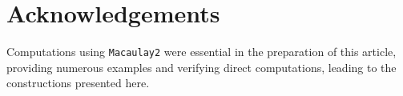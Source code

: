 \documentclass[reqno]{amsart}
\numberwithin{equation}{section}
\theoremstyle{definition}
\begin{document}
\section*{Acknowledgements}

Computations using \texttt{Macaulay2} \cite{Macaulay2} were essential in the preparation of this article, providing numerous examples and verifying direct computations, leading to the constructions presented here. 






\end{document}
